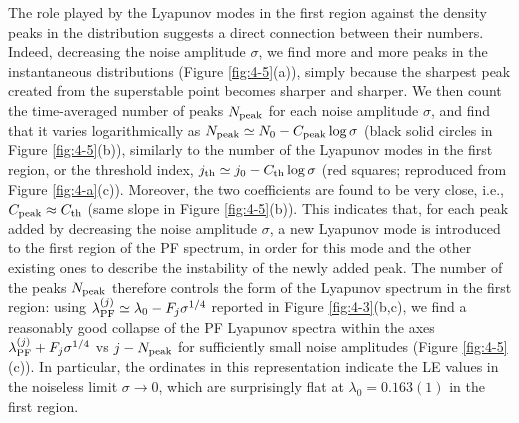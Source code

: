 \documentclass[12pt]{iopart}
\begin{document}
The role played by the Lyapunov modes in the first region
 against the density peaks in the distribution
suggests a direct connection between their numbers.
Indeed, decreasing the noise amplitude $\sigma$,
 we find more and more peaks in the instantaneous distributions
 (Figure \ref{fig:4-5}(a)), simply because
 the sharpest peak created from the superstable point
 becomes sharper and sharper.
We then count
 the time-averaged number of peaks $N_{\rm peak}$
 for each noise amplitude $\sigma$,
 and find that it varies logarithmically
 as $N_{\rm peak} \simeq N_0 - C_{\rm peak}\log\sigma$
 (black solid circles in Figure \ref{fig:4-5}(b)),
 similarly to the number of the Lyapunov modes in the first region,
 or the threshold index, $j_{\rm th} \simeq j_0 - C_{\rm th}\log\sigma$
 (red squares; reproduced from Figure \ref{fig:4-a}(c)).
Moreover, the two coefficients are found to be very close,
 i.e., $C_{\rm peak} \approx C_{\rm th}$
 (same slope in Figure \ref{fig:4-5}(b)).
This indicates that, 
 for each peak added by decreasing the noise amplitude $\sigma$,
 a new Lyapunov mode is introduced to the first region of the PF spectrum,
 in order for this mode and the other existing ones
 to describe the instability of the newly added peak.
The number of the peaks $N_{\rm peak}$ therefore controls
 the form of the Lyapunov spectrum in the first region:
 using $\lambda_{\rm PF}^{(j)} \simeq \lambda_0 - F_j \sigma^{1/4}$
 reported in Figure \ref{fig:4-3}(b,c),
 we find a reasonably good collapse of the PF Lyapunov spectra
 within the axes $\lambda_{\rm PF}^{(j)} + F_j \sigma^{1/4}$
 vs $j - N_{\rm peak}$ for sufficiently small noise amplitudes
 (Figure \ref{fig:4-5}(c)).
In particular,
 the ordinates in this representation indicate
 the LE values in the noiseless limit $\sigma \to 0$,
 which are surprisingly flat at $\lambda_0 = 0.163(1)$
 in the first region.
\end{document}
